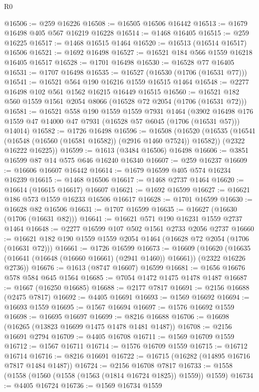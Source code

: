 \begin{lexlean}{R0}
\begin{coremodule}
@16506 := @259 @16226
@16508 := @16505 @16506 @16442
@16513 := @1679 @16498 @405 @567 @16219 @16228
@16514 := @1468 @16405
@16515 := @259 @16225
@16517 := @1468 @16515 @1464
@16520 := @16513 (@16514 @16517) @16506
@16521 := @1692 @16498
@16527 := @16521 @184 @566 @1559 @16218 @16405 @16517
@16528 := @1701 @16498
@16530 := @16528 @77 @16405
@16531 := @1707 @16498
@16535 := @16527 (@16530 (@1706 (@16531 @77)))
@16541 := @16521 @564 @190 @16216 @1559 @16515 @1464
@16548 := @2277 @16498 @102 @561 @1562 @16215 @16449 @16515
@16560 := @16521 @182 @560 @1559 @1561 @2054 @8066 (@16528 @72 @2054 (@1706 (@16531 @72)))
@16581 := @16521
    @558
    @190
    @1559
    @1559
    @7931
    @1464
    (@3902 @16498 @176 @1559 @47 @14000 @47 @7931 (@16528 @57 @6045 (@1706 (@16531 @57))) @14014)
@16582 := @1726 @16498
@16596 := @16508
    (@16520
      (@16535 (@16541 (@16548 (@16560 (@16581 @16582)) (@2916 @1460 @7524)) @16582))
      (@2322 @16222 @16225))
@16599 := @1613 (@3484 @16506) @16498
@16606 := @3851 @16599 @87 @14 @575 @646 @16240 @16340
@16607 := @259 @16237
@16609 := @16606 @16607 @16442
@16614 := @1679 @16599 @405 @574 @16234 @16239
@16615 := @1468 @16506
@16617 := @1468 @2737 @1464
@16620 := @16614 (@16615 @16617) @16607
@16621 := @1692 @16599
@16627 := @16621 @186 @573 @1559 @16233 @16506 @16617
@16628 := @1701 @16599
@16630 := @16628 @82 @16506
@16631 := @1707 @16599
@16635 := @16627 (@16630 (@1706 (@16631 @82)))
@16641 := @16621 @571 @190 @16231 @1559 @2737 @1464
@16648 := @2277 @16599 @107 @502 @1561 @2733 @2056 @2737
@16660 := @16621 @182 @190 @1559 @1559 @2054 @1464 (@16628 @72 @2054 (@1706 (@16631 @72)))
@16661 := @1726 @16599
@16673 := @16609
    (@16620 (@16635 (@16641 (@16648 (@16660 @16661) (@2941 @1460)) @16661)) (@2322 @16226 @2736))
@16676 := @1613 (@8747 @16607) @16599
@16681 := @1656 @16676 @578 @584 @645 @1564
@16685 := @7054 @1472 @1475 @1478 @1487
@16687 := @1667 (@16250 @16685)
@16688 := @2177 @7817
@16691 := @2156 @16688 (@2475 @7817)
@16692 := @4405 @16691
@16693 := @1569 @16692
@16694 := @16693 @1559
@16695 := @1567 @16694
@16697 := @1576 @16692 @1559
@16698 := @16695 @16697
@16699 := @8216 @16688
@16706 := @16698 (@16265 (@13823 @16699 @1475 @1478 @1481 @1487))
@16708 := @2156 @16691 @2794
@16709 := @4405 @16708
@16711 := @1569 @16709 @1559
@16712 := @1567 @16711
@16714 := @1576 @16709 @1559
@16715 := @16712 @16714
@16716 := @8216 @16691
@16722 := @16715 (@16282 (@14895 @16716 @7817 @1484 @1487))
@16724 := @2156 @16708 @7817
@16733 := @1558 (@1558 (@1560 (@1558 (@1563 (@1814 @16724 @1825)) @1559)) @1559)
@16734 := @4405 @16724
@16736 := @1569 @16734 @1559

\end{coremodule}
\end{lexlean}
